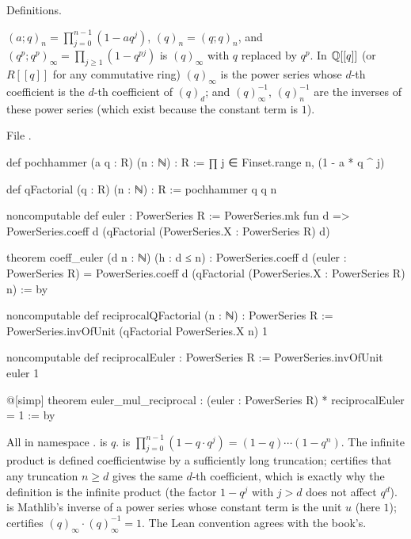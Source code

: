 \begin{status}
Definitions.
\end{status}

\begin{definition}\label{l20:def:euler}
$(a;q)_n=\prod_{j=0}^{n-1}(1-aq^j)$, $(q)_n=(q;q)_n$, and $(q^p;q^p)_\infty=\prod_{j\ge1}(1-q^{pj})$ is $(q)_\infty$
with $q$ replaced by $q^p$. In ${\mathbb{Q}}[[q]]$ (or $R[[q]]$ for any commutative ring)
$(q)_\infty$ is the power series whose $d$-th coefficient is the $d$-th coefficient of $(q)_d$; and
$(q)_\infty^{-1}$, $(q)_n^{-1}$ are the inverses of these power series (which exist because the constant term
is $1$).
\end{definition}
\noindent File .
\begin{leancode}
def pochhammer (a q : R) (n : ℕ) : R :=
  ∏ j ∈ Finset.range n, (1 - a * q ^ j)

def qFactorial (q : R) (n : ℕ) : R := pochhammer q q n

noncomputable def euler : PowerSeries R :=
  PowerSeries.mk fun d => PowerSeries.coeff d (qFactorial (PowerSeries.X : PowerSeries R) d)

theorem coeff_euler (d n : ℕ) (h : d ≤ n) :
    PowerSeries.coeff d (euler : PowerSeries R) =
      PowerSeries.coeff d (qFactorial (PowerSeries.X : PowerSeries R) n) := by

noncomputable def reciprocalQFactorial (n : ℕ) : PowerSeries R :=
  PowerSeries.invOfUnit (qFactorial PowerSeries.X n) 1

noncomputable def reciprocalEuler : PowerSeries R := PowerSeries.invOfUnit euler 1

@[simp] theorem euler_mul_reciprocal :
    (euler : PowerSeries R) * reciprocalEuler = 1 := by
\end{leancode}

\begin{dictionary}
All in namespace .  is $q$.  is
$\prod_{j=0}^{n-1}(1-q\cdot q^j)=(1-q)\cdots(1-q^n)$. The infinite product is defined
coefficientwise by a sufficiently long truncation;  certifies that any truncation $n\ge d$
gives the same $d$-th coefficient, which is exactly why the definition is the infinite product (the factor
$1-q^{j}$ with $j>d$ does not affect $q^d$).  is Mathlib's inverse of a power
series whose constant term is the unit $u$ (here $1$);  certifies
$(q)_\infty\cdot(q)_\infty^{-1}=1$. The Lean convention agrees with the book's.
\end{dictionary}


